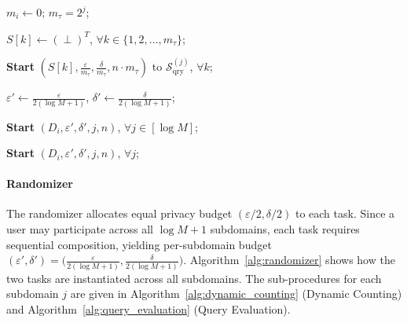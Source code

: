 \begin{algorithm}[t]
\caption{Query Evaluation (User Side)}
\label{alg:query_evaluation}


$m_i \leftarrow 0$; $m_\tau=2^j$;

$S[k] \leftarrow (\perp)^T$, $\forall k \in \{1,2,\dots,m_\tau\}$;

\textbf{Start} \RQ$(S[k], \frac{\varepsilon}{m_\tau}, \frac{\delta}{m_\tau}, n\cdot m_\tau )$ to $\mathcal{S}^{(j)}_{\mathrm{qry}}$, $\forall  k$;



\end{algorithm}

\begin{algorithm}[t]
\caption{Randomizer}
\label{alg:randomizer}

$\varepsilon' \leftarrow \frac{\varepsilon}{2(\log M+1)}$, $\delta' \leftarrow\frac{\delta}{2(\log M+1)}$;


\textbf{Start} \DynCount$(D_i,\varepsilon', \delta', j, n)$, $\forall j \in [\log M]$;


\textbf{Start} \QueryEva$(D_i, \varepsilon', \delta', j, n)$, $\forall j$;

\end{algorithm}



\paragraph{Randomizer}



The randomizer allocates equal privacy budget $(\varepsilon/2, \delta/2)$ to each task. 
Since a user may participate across all $\log M+1$ subdomains, each task requires sequential composition, yielding per-subdomain budget $(\varepsilon', \delta') = \big(\frac{\varepsilon}{2(\log M+1)}, \frac{\delta}{2(\log M+1)}\big)$. 
Algorithm~\ref{alg:randomizer} shows how the two tasks are instantiated across all subdomains.
The sub-procedures for each subdomain $j$ are given in Algorithm~\ref{alg:dynamic_counting} (Dynamic Counting) and Algorithm~\ref{alg:query_evaluation} (Query Evaluation).


